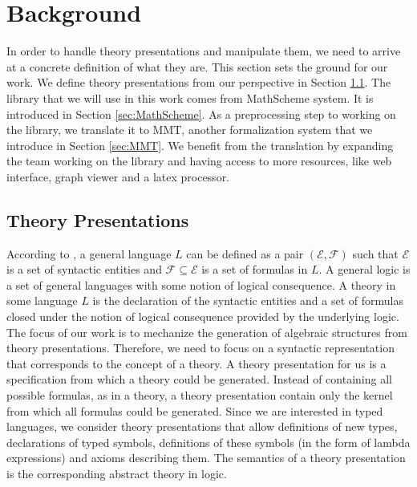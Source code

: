 
\section{Background}
\label{sec:theory_presentations}
In order to handle theory presentations and manipulate them, we need to arrive at a concrete 
definition of what they are. This section sets the ground for our work. We define theory 
presentations from our perspective in Section \ref{sec:ThryPres}. The library that we will use in this 
work comes from MathScheme system. It is introduced in Section \ref{sec:MathScheme}. As a 
preprocessing step to working on the library, we translate it to MMT, another formalization system 
that we introduce in Section \ref{sec:MMT}. We benefit from the translation by expanding the team 
working on the library and having access to more resources, like web interface, graph viewer and a 
latex processor.

\subsection{Theory Presentations}
\label{sec:ThryPres}
According to \cite{farmer2007biform}, a general language $L$ can be defined as a pair $(\mathcal{E} , 
\mathcal{F})$ such that $\mathcal{E}$ is a set of syntactic entities and $\mathcal{F} \subseteq 
\mathcal{E}$ is a set of formulas in $L$. A general logic is a set of general languages with some notion 
of logical consequence. A theory in  some language $L$ is the declaration of the syntactic entities and 
a set of formulas closed under the notion of logical consequence provided by the underlying logic. 
The focus of our work is to mechanize the generation of algebraic structures from theory presentations. Therefore, we need to focus on a syntactic representation that corresponds to the concept of a theory. 
A theory presentation for us is a specification from which a theory could be generated. Instead of 
containing all possible formulas, as in a theory, a theory presentation contain only the kernel from 
which all formulas could be generated. Since we are interested in typed languages, we consider theory 
presentations that allow definitions of new types, declarations of typed symbols, definitions of these 
symbols (in the form of lambda expressions) and axioms describing them. The semantics of a theory 
presentation is the corresponding abstract theory in logic. 

